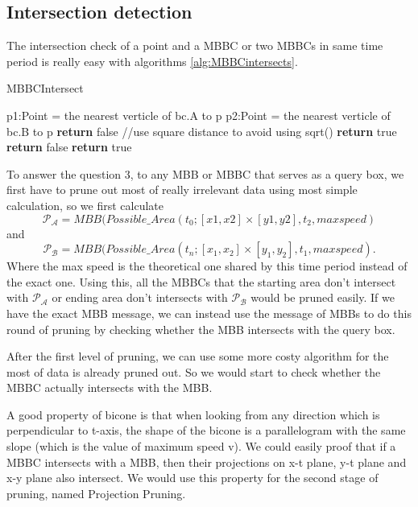 \documentclass[sigplan]{acmart}
\begin{document}
\subsection{Intersection detection}
The intersection check of a point and a MBBC or two MBBCs in same time period is really easy with algorithms \ref{alg:MBBCintersects}.\par

\begin{algorithm}
\caption{MBBCIntersect} \label{alg:MBBCintersects}
\begin{algorithmic}[ht]
    p1:Point = the nearest verticle of bc.A to p
    p2:Point = the nearest verticle of bc.B to p
        \State \textbf{return} false //use square distance to avoid using sqrt()
    \EndIf
    \State \textbf{return} true
\EndFunction
{}
        \State \textbf{return} false
    \EndIf
    \State \textbf{return} true
\EndFunction
\end{algorithmic}
\end{algorithm}

To answer the question 3, to any MBB or MBBC that serves as a query box, we first have to prune out most of really irrelevant data using most simple calculation, so we first calculate
$$\mathcal{P_A} = MBB(Possible\_Area(t_0;[x1,x2] \times [y1,y2], t_2, maxspeed)$$
and
$$\mathcal{P_B} = MBB(Possible\_Area(t_n;[x_1,x_2] \times [y_1,y_2], t_1, maxspeed).$$
Where the max speed is the theoretical one shared by this time period instead of the exact one. Using this, all the MBBCs that the starting area don't intersect with $\mathcal{P_A}$ or ending area don't intersects with $\mathcal{P_B}$ would be pruned easily. If we have the exact MBB message, we can instead use the message of MBBs to do this round of pruning by checking whether the MBB intersects with the query box. \par
After the first level of pruning, we can use some more costy algorithm for the most of data is already pruned out. So we would start to check whether the MBBC actually intersects with the MBB.\par
A good property of bicone is that when looking from any direction which is perpendicular to t-axis, the shape of the bicone is a parallelogram with the same slope (which is the value of maximum speed v). We could easily proof that if a MBBC intersects with a MBB, then their projections on x-t plane, y-t plane and x-y plane also intersect. We would use this property for the second stage of pruning, named Projection Pruning. \par
\end{document}
